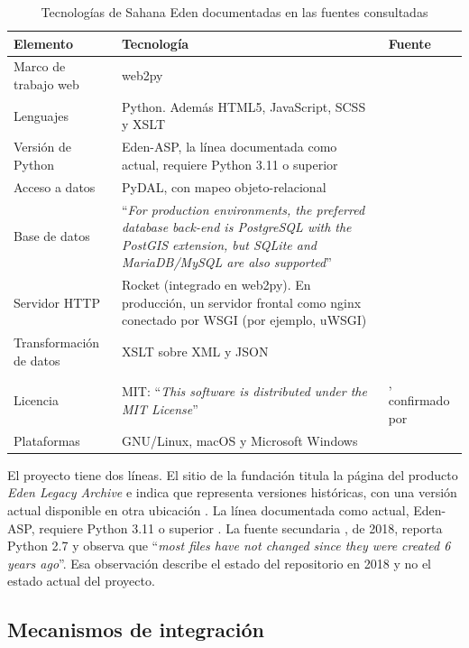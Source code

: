 \documentclass[11pt,letterpaper]{article}
\begin{document}
\begin{table}[H]
\centering
\caption{Tecnologías de Sahana Eden documentadas en las fuentes consultadas}\label{tab:sahana-tec}
\begin{tabular}{L{3.6cm} L{8.4cm} L{3.6cm}}
\toprule
\textbf{Elemento} & \textbf{Tecnología} & \textbf{Fuente} \\
\midrule
Marco de trabajo web & web2py & \cite{eden-basics,eden-wiki} \\
Lenguajes & Python. Además HTML5, JavaScript, SCSS y XSLT & \cite{eden-asp} \\
Versión de Python & Eden-ASP, la línea documentada como actual, requiere Python 3.11 o superior &
\cite{eden-asp} \\
Acceso a datos & PyDAL, con mapeo objeto-relacional & \cite{eden-basics} \\
Base de datos & \enquote{\emph{For production environments, the preferred database back-end is
PostgreSQL with the PostGIS extension, but SQLite and MariaDB/MySQL are also supported}} &
\cite{eden-basics} \\
Servidor HTTP & Rocket (integrado en web2py). En producción, un servidor frontal como nginx
conectado por WSGI (por ejemplo, uWSGI) & \cite{eden-basics} \\
Transformación de datos & XSLT sobre XML y JSON & \cite{eden-xslt} \\
Licencia & MIT: \enquote{\emph{This software is distributed under the MIT License}} &
\cite{eden-license}, confirmado por \cite{osgeo} \\
Plataformas & GNU/Linux, macOS y Microsoft Windows & \cite{osgeo} \\
\bottomrule
\end{tabular}
\end{table}

El proyecto tiene dos líneas. El sitio de la fundación titula la página del producto \emph{Eden
Legacy Archive} e indica que representa versiones históricas, con una versión actual disponible en
otra ubicación \cite{sahana-eden-legacy}. La línea documentada como actual, Eden-ASP, requiere Python
3.11 o superior \cite{eden-asp}. La fuente secundaria \cite{desosa2018}, de 2018, reporta Python 2.7
y observa que \enquote{\emph{most files have not changed since they were created 6 years ago}}. Esa
observación describe el estado del repositorio en 2018 y no el estado actual del proyecto.

\subsection{Mecanismos de integración}
\label{sec:sahana-integracion}
\end{document}
